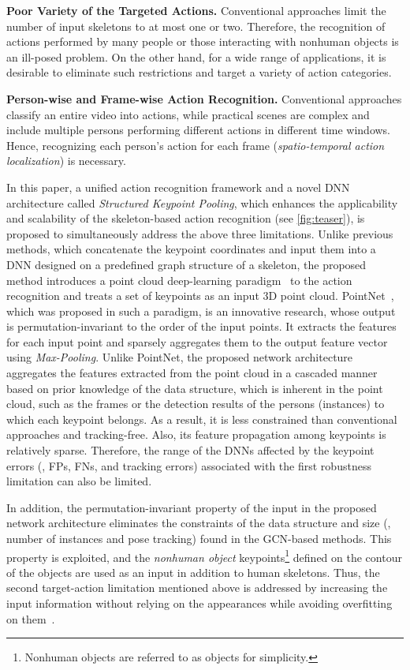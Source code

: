 \documentclass[10pt,twocolumn,letterpaper]{article}
\begin{document}
\noindent \textbf{Poor Variety of the Targeted Actions.}
Conventional approaches limit the number of input skeletons to at most one or two.
Therefore, the recognition of actions performed by many people or those interacting with nonhuman objects is an ill-posed problem.
On the other hand, for a wide range of applications, it is desirable to eliminate such restrictions and target a variety of action categories.

\noindent \textbf{Person-wise and Frame-wise Action Recognition.}
Conventional approaches classify an entire video into actions, while practical scenes are complex and include multiple persons performing different actions in different time windows.
Hence, recognizing each person's action for each frame (\textit{spatio-temporal action localization}) is necessary.

In this paper, a unified action recognition framework and a novel DNN architecture called \textit{Structured Keypoint Pooling}, which enhances the applicability and scalability of the skeleton-based action recognition (see \cref{fig:teaser}), is proposed to simultaneously address the above three limitations.
Unlike previous methods, which concatenate the keypoint coordinates and input them into a DNN designed on a predefined graph structure of a skeleton, the proposed method introduces a point cloud deep-learning paradigm~\cite{Qi2017CVPR,Qi2017Neurips,Zhao2021ICCV} to the action recognition and treats a set of keypoints as an input 3D point cloud.
PointNet~\cite{Qi2017CVPR}, which was proposed in such a paradigm, is an innovative research, whose output is permutation-invariant to the order of the input points.
It extracts the features for each input point and sparsely aggregates them to the output feature vector using \textit{Max-Pooling}.
Unlike PointNet, the proposed network architecture aggregates the features extracted from the point cloud in a cascaded manner based on prior knowledge of the data structure, which is inherent in the point cloud, such as the frames or the detection results of the persons (instances) to which each keypoint belongs.
As a result, it is less constrained than conventional approaches and tracking-free. Also, its feature propagation among keypoints is relatively sparse. Therefore, the range of the DNNs affected by the keypoint errors (\eg, FPs, FNs, and tracking errors) associated with the first robustness limitation can also be limited.

In addition, the permutation-invariant property of the input in the proposed network architecture eliminates the constraints of the data structure and size (\eg, number of instances and pose tracking) found in the GCN-based methods.
This property is exploited, and the {\it nonhuman object} keypoints\footnote{Nonhuman objects are referred to as objects for simplicity.} defined on the contour of the objects are used as an input in addition to human skeletons.
Thus, the second target-action limitation mentioned above is addressed by increasing the input information without relying on the appearances while avoiding overfitting on them~\cite{Choi2019Neurips,Weinzaepfel2021IJCV,Moon2021CVPR}.
\end{document}
